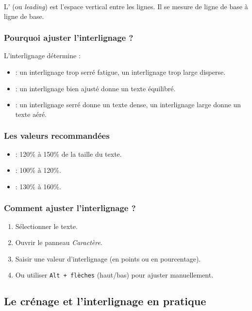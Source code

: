 L' (ou \emph{leading}) est l'espace vertical entre les lignes. Il se mesure de ligne de base à ligne de base.

\subsubsection{Pourquoi ajuster l'interlignage ?}

L'interlignage détermine :

\begin{itemize}
    \item {} : un interlignage trop serré fatigue, un interlignage trop large disperse.
    \item {} : un interlignage bien ajusté donne un texte équilibré.
    \item {} : un interlignage serré donne un texte dense, un interlignage large donne un texte aéré.
\end{itemize}

\subsubsection{Les valeurs recommandées}

\begin{itemize}
    \item {} : 120\% à 150\% de la taille du texte.
    \item {} : 100\% à 120\%.
    \item {} : 130\% à 160\%.
\end{itemize}

\subsubsection{Comment ajuster l'interlignage ?}

\begin{enumerate}
    \item Sélectionner le texte.
    \item Ouvrir le panneau \emph{Caractère}.
    \item Saisir une valeur d'interlignage (en points ou en pourcentage).
    \item Ou utiliser \texttt{Alt + flèches} (haut/bas) pour ajuster manuellement.
\end{enumerate}

\subsection{Le crénage et l'interlignage en pratique}

